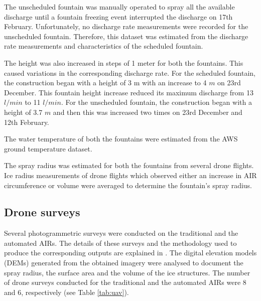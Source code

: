 \documentclass[tc, manuscript]{copernicus}
\begin{document}
The unscheduled fountain was manually operated to spray all the available discharge until a fountain freezing
event interrupted the discharge on 17th February. Unfortunately, no discharge rate measurements were recorded
for the unscheduled fountain. Therefore, this dataset was estimated from the discharge rate measurements and
characteristics of the scheduled fountain.

The height was also increased in steps of 1 meter for both the fountains. This caused variations in the
corresponding discharge rate. For the scheduled fountain, the construction began with a height of 3 m with an
increase to 4 $m$ on 23rd December. This fountain height increase reduced its maximum discharge from
13 $l/min$ to 11 $l/min$. For the unscheduled fountain, the construction began with a height of 3.7 $m$ and then
this was increased two times on 23rd December and 12th February.  

The water temperature of both the fountains were estimated from the AWS ground temperature dataset.

The spray radius was estimated for both the fountains from several drone flights. Ice radius measurements of
drone flights which observed either an increase in AIR circumference or volume were averaged to determine the
fountain's spray radius.

\subsection{Drone surveys}

Several photogrammetric surveys were conducted on the traditional and the automated AIRs. The details of these
surveys and the methodology used to produce the corresponding outputs are explained in
\cite{balasubramanianInfluenceMeteorologicalConditions2022}. The digital elevation models (DEMs) generated from
the obtained imagery were analysed to document the spray radius, the surface area and the volume of the ice
structures.  The number of drone surveys conducted for the traditional and the automated AIRs were 8 and 6,
respectively (see Table \ref{tab:uav}). 
\end{document}
